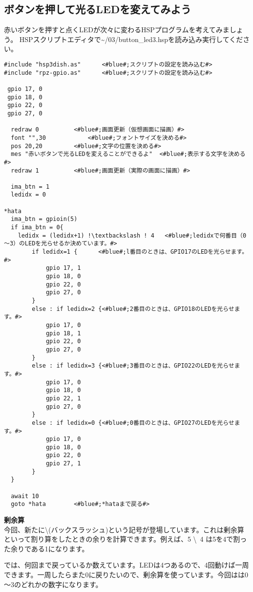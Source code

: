 \subsection{ボタンを押して光るLEDを変えてみよう}
赤いボタンを押すと点くLEDが次々に変わるHSPプログラムを考えてみましょう。
HSPスクリプトエディタで\textasciitilde /03/button\_led3.hspを読み込み実行してください。

\begin{lstlisting}[escapechar=!,caption=button\_led3.hsp,label=button_led3.hsp]
#include "hsp3dish.as"		<#blue#;スクリプトの設定を読み込む#>
#include "rpz-gpio.as"		<#blue#;スクリプトの設定を読み込む#>

 gpio 17, 0
 gpio 18, 0
 gpio 22, 0
 gpio 27, 0
	
  redraw 0			<#blue#;画面更新（仮想画面に描画）#>
  font "",30			<#blue#;フォントサイズを決める#>
  pos 20,20			<#blue#;文字の位置を決める#>
  mes "赤いボタンで光るLEDを変えることができるよ"	<#blue#;表示する文字を決める#>
  redraw 1			<#blue#;画面更新（実際の画面に描画）#>

  ima_btn = 1
  ledidx = 0

*hata
  ima_btn = gpioin(5)
  if ima_btn = 0{
    ledidx = (ledidx+1) !\textbackslash ! 4	  <#blue#;ledidxで何番目（0～3）のLEDを光らせるか決めています。#>
		if ledidx=1 {      <#blue#;l番目のときは、GPIO17のLEDを光らせます。#>
			gpio 17, 1
			gpio 18, 0
			gpio 22, 0
			gpio 27, 0
		}
		else : if ledidx=2 {<#blue#;2番目のときは、GPIO18のLEDを光らせます。#>
			gpio 17, 0
			gpio 18, 1
			gpio 22, 0
			gpio 27, 0
		}
		else : if ledidx=3 {<#blue#;3番目のときは、GPIO22のLEDを光らせます。#>
			gpio 17, 0
			gpio 18, 0
			gpio 22, 1
			gpio 27, 0
		}
		else : if ledidx=0 {<#blue#;0番目のときは、GPIO27のLEDを光らせます。#>
			gpio 17, 0
			gpio 18, 0
			gpio 22, 0
			gpio 27, 1
		}
  }

  await 10
  goto *hata		<#blue#;*hataまで戻る#>
\end{lstlisting}

\textbf{剰余算 }\\
今回、新たに\textbackslash (バックスラッシュ)という記号が登場しています。これは剰余算といって割り算をしたときの余りを計算できます。例えば、5 \textbackslash \ 4 は5を4で割った余りである1になります。

では、何回まで戻っているか数えています。LEDは4つあるので、4回動けば一周できます。一周したらまた0に戻りたいので、剰余算を使っています。今回はは0～3のどれかの数字になります。\\

